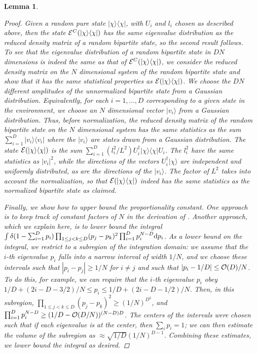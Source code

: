\documentclass[aps,prl,amsmath,amssymb,amsfonts,superscriptaddress,floatfix]{revtex4}
\newtheorem{lemma}{Lemma}
\newcommand{\conc}{{\cal E}^C}
\begin{document}
\begin{lemma}
\begin{proof}
Given a random pure state $|\chi\rangle\langle\chi|$, with $U_i$ and $l_i$ chosen as
described above, then the state $\conc(|\chi\rangle\langle\chi|)$ has the same eigenvalue distribution
as the reduced density matrix of a random bipartite state, so the second
result follows.  To see that the eigenvalue distribution of
a random bipartite state in $DN$ dimensions is indeed the same as that of
$\conc(|\chi\rangle\langle\chi|)$, we consider the reduced density
matrix on the $N$ dimensional system of the random bipartite state and
show that it has the same statistical properties as
${\cal E}(|\chi\rangle\langle\chi|)$.  We choose the $DN$ different
amplitudes of the 
unnormalized bipartite
state from a Gaussian distribution.
Equivalently, for each $i=1,...,D$ corresponding to a given
state in the environment, we choose an $N$ dimensional
vector $|v_i\rangle$
from a Gaussian distribution.  Thus, before normalization,
the reduced density matrix of the random bipartite state on the $N$
dimensional system has the same statistics as the sum $\sum_{i=1}^D
|v_i\rangle\langle v_i|$ where the $|v_i\rangle$ are states
drawn from a Gaussian distribution.  The state
${\cal E}(|\chi\rangle\langle\chi|)$
is the sum $\sum_{i=1}^D (l_i^2/L^2) U_i^{\dagger} |\chi\rangle\langle\chi|
U_i$.  The
$l_i^2$ have the same statistics as $|v_i|^2$, while the
directions of the vectors $U_i^{\dagger}|\chi\rangle$ are independent
and uniformly distributed, as are the directions of the $|v_i\rangle$.
The factor of $L^2$
takes into account the normalization, so that
${\cal E}(|\chi\rangle\langle\chi|)$ indeed has the same statistics
as the normalized bipartite state as claimed.


Finally, we show how to upper bound the proportionality constant.  One
approach is to keep track of constant factors of $N$ in the derivation of
\cite{pl,pl2}.  Another approach, which we explain here, is to lower bound
the integral
$\int 
\delta(1-\sum_{i=1}^D p_i) \prod_{1\leq j<k\leq D} (p_j-p_k)^2
\prod_{i=1}^D p_i^{N-D} {\rm d}p_i$.  As a lower bound on the integral,
we restrict to a subregion of the integration domain: we assume that
the $i$-th eigenvalue $p_i$ falls into a narrow interval of width $1/N$,
and we choose these intervals such that $|p_i-p_j|\geq 1/N$ for $i \neq j$
and such that
$|p_i-1/D|\leq {\cal O}(D)/N$.  To do this, for example, we can require that the
$i$-th eigenvalue $p_i$ obey $1/D+(2i-D-3/2)/N\leq p_i \leq 1/D+(2i-D-1/2)/N$.
Then, in this subregion, $\prod_{1\leq j<k\leq D} (p_j-p_k)^2\geq
(1/N)^{D^2}$, and $\prod_{i=1}^D p_i^{N-D} \geq (1/D-{\cal O}(D/N))^{(N-D)D}$.
The centers of the intervals were chosen such that if each eigenvalue is
at the center, then $\sum_i p_i=1$; we can then estimate the volume of
the subregion as $\approx \sqrt{1/D} (1/N)^{D-1}$.  Combining these
estimates, we lower bound the integral as desired.
\end{proof}
\end{lemma}
\end{document}
